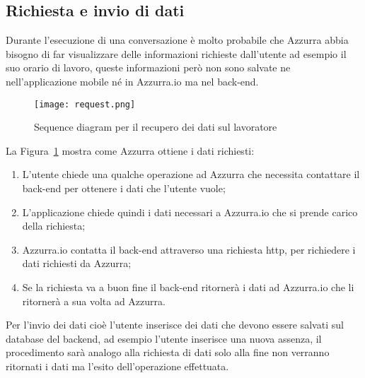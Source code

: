 \subsection{Richiesta e invio di dati}
Durante l'esecuzione di una conversazione è molto probabile che Azzurra abbia bisogno di far visualizzare delle informazioni richieste dall'utente ad esempio il suo orario di lavoro, queste informazioni però non sono salvate ne nell'applicazione mobile né in Azzurra.io ma nel back-end.
\begin{figure}[h]
	\begin{center}
		\texttt{[image: request.png]}
		\caption{Sequence diagram per il recupero dei dati sul lavoratore}\label{fig:request}
	\end{center}
\end{figure}
La Figura~\ref{fig:request} mostra come Azzurra ottiene i dati richiesti:
\begin{enumerate}
	\item L'utente chiede una qualche operazione ad Azzurra che necessita contattare il back-end per ottenere i dati che l'utente vuole;
	\item L'applicazione chiede quindi i dati necessari a Azzurra.io che si prende carico della richiesta;
	\item Azzurra.io contatta il back-end attraverso una richiesta \gls{http}\ap{[g]}, per richiedere i dati richiesti da Azzurra;
	\item Se la richiesta va a buon fine il back-end ritornerà i dati ad Azzurra.io che li ritornerà a sua volta ad Azzurra.
\end{enumerate}
Per l'invio dei dati cioè l'utente inserisce dei dati che devono essere salvati sul database del backend, ad esempio l'utente inserisce una nuova assenza, il procedimento sarà analogo alla richiesta di dati solo alla fine non verranno ritornati i dati ma l'esito dell'operazione effettuata.
